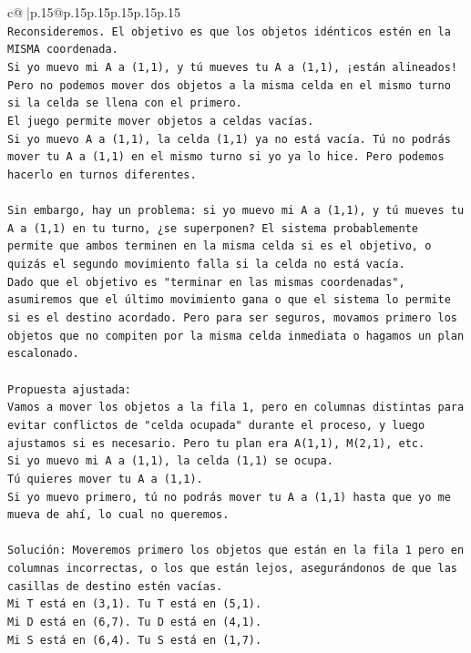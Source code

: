 \documentclass{article}
\begin{document}
{\begin{supertabular}{c@{$\;$}|p{.15\linewidth}@{}p{.15\linewidth}p{.15\linewidth}p{.15\linewidth}p{.15\linewidth}p{.15\linewidth}}
{{{\\ 
\texttt{Reconsideremos. El objetivo es que los objetos idénticos estén en la MISMA coordenada.} \\
\texttt{Si yo muevo mi A a (1,1), y tú mueves tu A a (1,1), ¡están alineados! Pero no podemos mover dos objetos a la misma celda en el mismo turno si la celda se llena con el primero.} \\
\texttt{El juego permite mover objetos a celdas vacías.} \\
\texttt{Si yo muevo A a (1,1), la celda (1,1) ya no está vacía. Tú no podrás mover tu A a (1,1) en el mismo turno si yo ya lo hice. Pero podemos hacerlo en turnos diferentes.} \\
\\ 
\texttt{Sin embargo, hay un problema: si yo muevo mi A a (1,1), y tú mueves tu A a (1,1) en tu turno, ¿se superponen? El sistema probablemente permite que ambos terminen en la misma celda si es el objetivo, o quizás el segundo movimiento falla si la celda no está vacía.} \\
\texttt{Dado que el objetivo es "terminar en las mismas coordenadas", asumiremos que el último movimiento gana o que el sistema lo permite si es el destino acordado. Pero para ser seguros, movamos primero los objetos que no compiten por la misma celda inmediata o hagamos un plan escalonado.} \\
\\ 
\texttt{Propuesta ajustada:} \\
\texttt{Vamos a mover los objetos a la fila 1, pero en columnas distintas para evitar conflictos de "celda ocupada" durante el proceso, y luego ajustamos si es necesario. Pero tu plan era A(1,1), M(2,1), etc.} \\
\texttt{Si yo muevo mi A a (1,1), la celda (1,1) se ocupa.} \\
\texttt{Tú quieres mover tu A a (1,1).} \\
\texttt{Si yo muevo primero, tú no podrás mover tu A a (1,1) hasta que yo me mueva de ahí, lo cual no queremos.} \\
\\ 
\texttt{Solución: Moveremos primero los objetos que están en la fila 1 pero en columnas incorrectas, o los que están lejos, asegurándonos de que las casillas de destino estén vacías.} \\
\texttt{Mi T está en (3,1). Tu T está en (5,1).} \\
\texttt{Mi D está en (6,7). Tu D está en (4,1).} \\
\texttt{Mi S está en (6,4). Tu S está en (1,7).} \\
}}}
\end{supertabular}}
\end{document}
